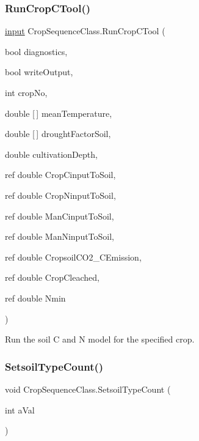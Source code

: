 \subsubsection{\texorpdfstring{RunCropCTool()}{RunCropCTool()}}
{\footnotesize\ttfamily \mbox{\hyperlink{struct_crop_sequence_class_1_1input}{input}} Crop\+Sequence\+Class.\+Run\+Crop\+C\+Tool (\begin{DoxyParamCaption}\item[{bool}]{diagnostics,  }\item[{bool}]{write\+Output,  }\item[{int}]{crop\+No,  }\item[{double \mbox{[}$\,$\mbox{]}}]{mean\+Temperature,  }\item[{double \mbox{[}$\,$\mbox{]}}]{drought\+Factor\+Soil,  }\item[{double}]{cultivation\+Depth,  }\item[{ref double}]{Crop\+Cinput\+To\+Soil,  }\item[{ref double}]{Crop\+Ninput\+To\+Soil,  }\item[{ref double}]{Man\+Cinput\+To\+Soil,  }\item[{ref double}]{Man\+Ninput\+To\+Soil,  }\item[{ref double}]{Cropsoil\+C\+O2\+\_\+\+C\+Emission,  }\item[{ref double}]{Crop\+Cleached,  }\item[{ref double}]{Nmin }\end{DoxyParamCaption})\hspace{0.3cm}{\ttfamily [inline]}}



Run the soil C and N model for the specified crop. 

\mbox{\label{class_crop_sequence_class_ab592462fb7000ed8275da763baa9d7d8}} 
\subsubsection{\texorpdfstring{SetsoilTypeCount()}{SetsoilTypeCount()}}
{\footnotesize\ttfamily void Crop\+Sequence\+Class.\+Setsoil\+Type\+Count (\begin{DoxyParamCaption}\item[{int}]{a\+Val }\end{DoxyParamCaption})\hspace{0.3cm}{\ttfamily [inline]}}



